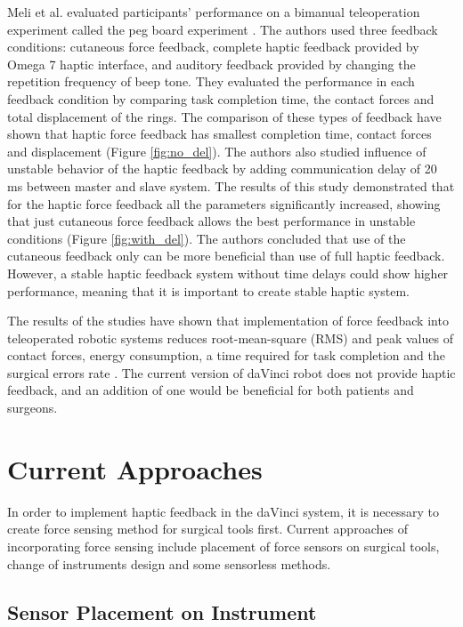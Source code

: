 Meli et al. evaluated participants' performance on a bimanual teleoperation experiment called the peg board experiment \cite{pacchierotti_2016}. The authors used three feedback conditions: cutaneous force feedback, complete haptic feedback provided by Omega 7 haptic interface, and auditory feedback provided by changing the repetition frequency of beep tone. They evaluated the performance in each feedback condition by comparing task completion time, the contact forces and total displacement of the rings. The comparison of these types of feedback have shown that haptic force feedback has smallest completion time, contact forces and displacement (Figure \ref{fig:no_del}). The authors also studied influence of unstable behavior of the haptic feedback by adding communication delay of 20 ms between master and slave system. The results of this study demonstrated that for the haptic force feedback all the parameters significantly increased, showing that just cutaneous force feedback allows the best performance in unstable conditions (Figure \ref{fig:with_del}). The authors concluded that use of the cutaneous feedback only can be more beneficial than use of full haptic feedback. However, a stable haptic feedback system without time delays could show higher performance, meaning that it is important to create stable haptic system.

The results of the studies \cite{wagner_benefit_2007, yiasemidou_faster_2011, currie_role_2017} have shown that implementation of force feedback into teleoperated robotic systems reduces root-mean-square (RMS) and peak values of contact forces, energy consumption, a time required for task completion and the surgical errors rate \cite{tavakoli_haptics_2008}. The current version of daVinci robot does not provide haptic feedback, and an addition of one would be beneficial for both patients and surgeons.

\section{Current Approaches}
\label{sec:CurAppr}

In order to implement haptic feedback in the daVinci system, it is necessary to create force sensing method for surgical tools first. Current approaches of incorporating force sensing include placement of force sensors on surgical tools, change of instruments design and some sensorless methods.

\subsection{Sensor Placement on Instrument}


